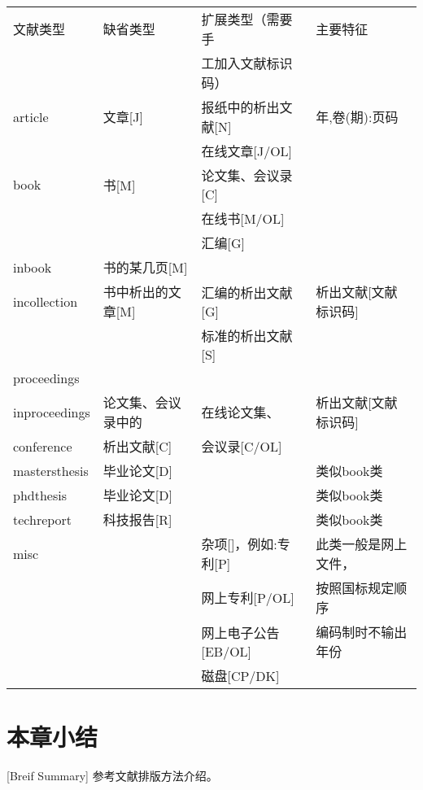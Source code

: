 \begin{table}[htbp]
  \vspace{0.5em}\centering\wuhao
  \begin{tabular}{llll}
    \toprule[1.5pt]
    文献类型      & 缺省类型           & 扩展类型（需要手     & 主要特征             \\
                  &                    & 工加入文献标识码）   &                      \\
    \midrule[1pt]
    article       & 文章[J]            & 报纸中的析出文献[N]  & 年,卷(期):页码       \\
                  &                    & 在线文章[J/OL]       &                      \\
    book          & 书[M]              & 论文集、会议录[C]    &                      \\
                  &                    & 在线书[M/OL]         &                      \\
                  &                    & 汇编[G]              &                      \\
    inbook        & 书的某几页[M]      &                      &                      \\
    incollection  & 书中析出的文章[M]  & 汇编的析出文献[G]    & 析出文献[文献标识码] \\
                  &                    & 标准的析出文献[S]    &                      \\
    proceedings   &                    &                      &                      \\
    inproceedings & 论文集、会议录中的 & 在线论文集、         & 析出文献[文献标识码] \\
    conference    & 析出文献[C]        & 会议录[C/OL]         &                      \\
    mastersthesis & 毕业论文[D]        &                      & 类似book类           \\
    phdthesis     & 毕业论文[D]        &                      & 类似book类           \\
    techreport    & 科技报告[R]        &                      & 类似book类           \\
    misc          &                    & 杂项[]，例如:专利[P] & 此类一般是网上文件， \\
                  &                    & 网上专利[P/OL]       & 按照国标规定顺序     \\
                  &                    & 网上电子公告[EB/OL]  & 编码制时不输出年份   \\
                  &                    & 磁盘[CP/DK]          &                      \\
    \bottomrule[1.5pt]
  \end{tabular}
\end{table}

\section*{本章小结}[Breif Summary]
参考文献排版方法介绍。

